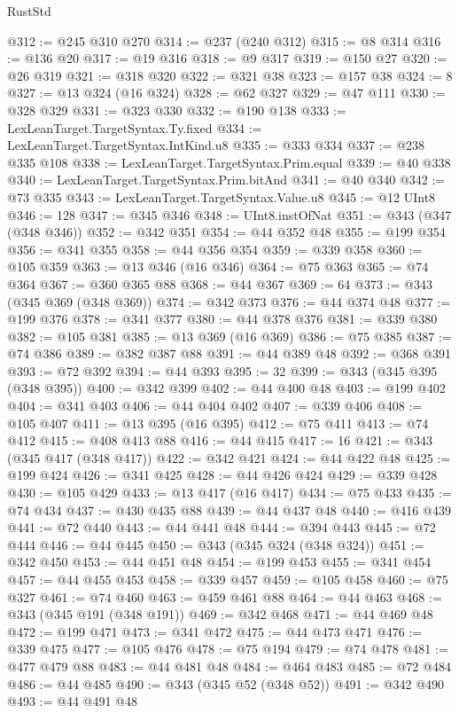 \begin{lexlean}{RustStd}
\begin{coremodule}
@312 := @245 @310 @270
@314 := @237 (@240 @312)
@315 := @8 @314
@316 := @136 @20
@317 := @19 @316
@318 := @9 @317
@319 := @150 @27
@320 := @26 @319
@321 := @318 @320
@322 := @321 @38
@323 := @157 @38
@324 := 8
@327 := @13 @324 (@16 @324)
@328 := @62 @327
@329 := @47 @111
@330 := @328 @329
@331 := @323 @330
@332 := @190 @138
@333 := LexLeanTarget.TargetSyntax.Ty.fixed
@334 := LexLeanTarget.TargetSyntax.IntKind.u8
@335 := @333 @334
@337 := @238 @335 @108
@338 := LexLeanTarget.TargetSyntax.Prim.equal
@339 := @40 @338
@340 := LexLeanTarget.TargetSyntax.Prim.bitAnd
@341 := @40 @340
@342 := @73 @335
@343 := LexLeanTarget.TargetSyntax.Value.u8
@345 := @12 UInt8
@346 := 128
@347 := @345 @346
@348 := UInt8.instOfNat
@351 := @343 (@347 (@348 @346))
@352 := @342 @351
@354 := @44 @352 @48
@355 := @199 @354
@356 := @341 @355
@358 := @44 @356 @354
@359 := @339 @358
@360 := @105 @359
@363 := @13 @346 (@16 @346)
@364 := @75 @363
@365 := @74 @364
@367 := @360 @365 @88
@368 := @44 @367
@369 := 64
@373 := @343 (@345 @369 (@348 @369))
@374 := @342 @373
@376 := @44 @374 @48
@377 := @199 @376
@378 := @341 @377
@380 := @44 @378 @376
@381 := @339 @380
@382 := @105 @381
@385 := @13 @369 (@16 @369)
@386 := @75 @385
@387 := @74 @386
@389 := @382 @387 @88
@391 := @44 @389 @48
@392 := @368 @391
@393 := @72 @392
@394 := @44 @393
@395 := 32
@399 := @343 (@345 @395 (@348 @395))
@400 := @342 @399
@402 := @44 @400 @48
@403 := @199 @402
@404 := @341 @403
@406 := @44 @404 @402
@407 := @339 @406
@408 := @105 @407
@411 := @13 @395 (@16 @395)
@412 := @75 @411
@413 := @74 @412
@415 := @408 @413 @88
@416 := @44 @415
@417 := 16
@421 := @343 (@345 @417 (@348 @417))
@422 := @342 @421
@424 := @44 @422 @48
@425 := @199 @424
@426 := @341 @425
@428 := @44 @426 @424
@429 := @339 @428
@430 := @105 @429
@433 := @13 @417 (@16 @417)
@434 := @75 @433
@435 := @74 @434
@437 := @430 @435 @88
@439 := @44 @437 @48
@440 := @416 @439
@441 := @72 @440
@443 := @44 @441 @48
@444 := @394 @443
@445 := @72 @444
@446 := @44 @445
@450 := @343 (@345 @324 (@348 @324))
@451 := @342 @450
@453 := @44 @451 @48
@454 := @199 @453
@455 := @341 @454
@457 := @44 @455 @453
@458 := @339 @457
@459 := @105 @458
@460 := @75 @327
@461 := @74 @460
@463 := @459 @461 @88
@464 := @44 @463
@468 := @343 (@345 @191 (@348 @191))
@469 := @342 @468
@471 := @44 @469 @48
@472 := @199 @471
@473 := @341 @472
@475 := @44 @473 @471
@476 := @339 @475
@477 := @105 @476
@478 := @75 @194
@479 := @74 @478
@481 := @477 @479 @88
@483 := @44 @481 @48
@484 := @464 @483
@485 := @72 @484
@486 := @44 @485
@490 := @343 (@345 @52 (@348 @52))
@491 := @342 @490
@493 := @44 @491 @48

\end{coremodule}
\end{lexlean}
